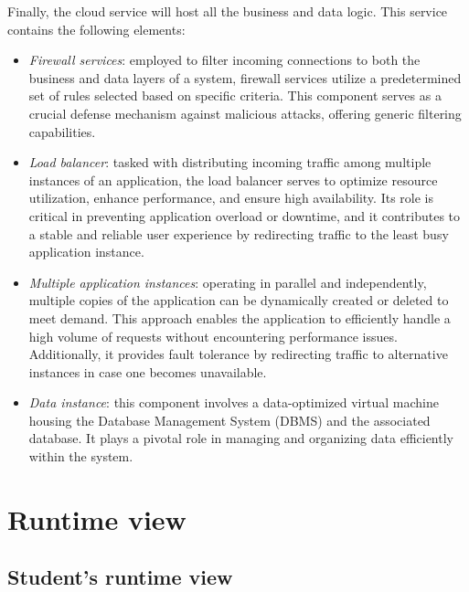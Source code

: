 \documentclass[12pt, a4paper]{report}
\begin{document}
    Finally, the cloud service will host all the business and data logic. 
    This service contains the following elements: 
    \begin{itemize}
        \item \textit{Firewall services}: employed to filter incoming connections to both the business and data layers of a system, firewall services utilize a predetermined set of rules selected based on specific criteria. 
            This component serves as a crucial defense mechanism against malicious attacks, offering generic filtering capabilities.
        \item \textit{Load balancer}: tasked with distributing incoming traffic among multiple instances of an application, the load balancer serves to optimize resource utilization, enhance performance, and ensure high availability. 
            Its role is critical in preventing application overload or downtime, and it contributes to a stable and reliable user experience by redirecting traffic to the least busy application instance.
        \item \textit{Multiple application instances}: operating in parallel and independently, multiple copies of the application can be dynamically created or deleted to meet demand. 
            This approach enables the application to efficiently handle a high volume of requests without encountering performance issues. 
            Additionally, it provides fault tolerance by redirecting traffic to alternative instances in case one becomes unavailable.
        \item \textit{Data instance}: this component involves a data-optimized virtual machine housing the Database Management System (DBMS) and the associated database. 
            It plays a pivotal role in managing and organizing data efficiently within the system.
    \end{itemize}

    \section{Runtime view}
    \subsection{Student's runtime view}
\end{document}
